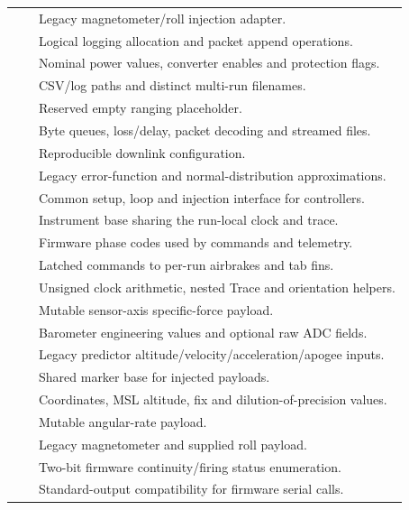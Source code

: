 \begin{longtable}{@{}>{\raggedright\arraybackslash}L{5.65cm}>{\raggedright\arraybackslash}L{2.1cm}>{\raggedright\arraybackslash}L{7.4cm}@{}}
 &  & Legacy magnetometer/roll injection adapter.\\
 &  & Logical logging allocation and packet append operations.\\
 &  & Nominal power values, converter enables and protection flags.\\
 &  & CSV/log paths and distinct multi-run filenames.\\
 &  & Reserved empty ranging placeholder.\\
 &  & Byte queues, loss/delay, packet decoding and streamed files.\\
 &  & Reproducible downlink configuration.\\
\pagebreak
{} &  & Legacy error-function and normal-distribution approximations.\\
 &  & Common setup, loop and injection interface for controllers.\\
 &  & Instrument base sharing the run-local clock and trace.\\
 &  & Firmware phase codes used by commands and telemetry.\\
 &  & Latched commands to per-run airbrakes and tab fins.\\
 &  & Unsigned clock arithmetic, nested Trace and orientation helpers.\\
 &  & Mutable sensor-axis specific-force payload.\\
 &  & Barometer engineering values and optional raw ADC fields.\\
 &  & Legacy predictor altitude/velocity/acceleration/apogee inputs.\\
 &  & Shared marker base for injected payloads.\\
 &  & Coordinates, MSL altitude, fix and dilution-of-precision values.\\
 &  & Mutable angular-rate payload.\\
 &  & Legacy magnetometer and supplied roll payload.\\
 &  & Two-bit firmware continuity/firing status enumeration.\\
 & \newline{} & Standard-output compatibility for firmware serial calls.\\
\end{longtable}
\normalsize

